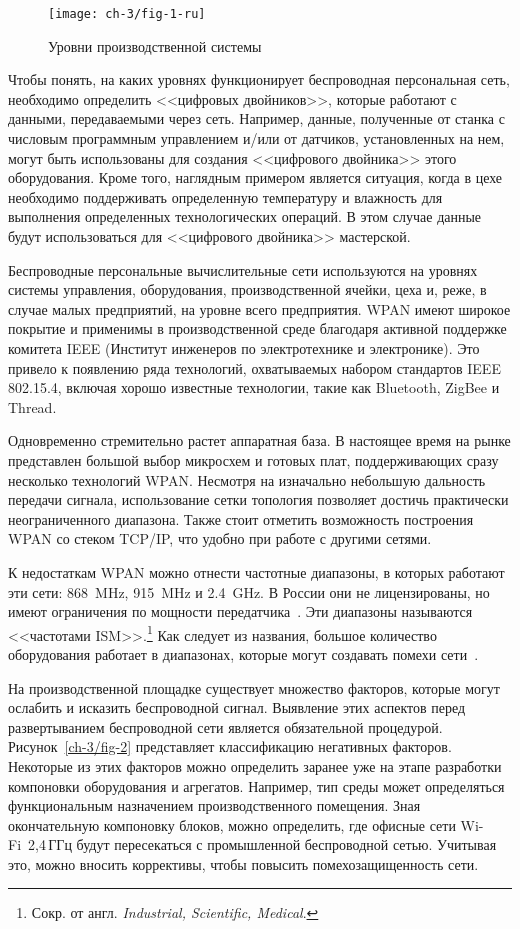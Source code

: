 \begin{figure*} [tb]
	\centering
	\texttt{[image: ch-3/fig-1-ru]}
	\caption{Уровни производственной системы}
	\label{ch-3/fig-1}
\end{figure*}

Чтобы понять, на каких уровнях функционирует беспроводная персональная сеть, необходимо определить <<цифровых двойников>>, которые работают с данными, передаваемыми через сеть. Например, данные, полученные от станка с числовым программным управлением и/или от датчиков, установленных на нем, могут быть использованы для создания <<цифрового двойника>> этого оборудования. Кроме того, наглядным примером является ситуация, когда в цехе необходимо поддерживать определенную температуру и влажность для выполнения определенных технологических операций. В этом случае данные будут использоваться для <<цифрового двойника>> мастерской.

Беспроводные персональные вычислительные сети используются на уровнях системы управления, оборудования, производственной ячейки, цеха и, реже, в случае малых предприятий, на уровне всего предприятия. WPAN имеют широкое покрытие и применимы в производственной среде благодаря активной поддержке комитета IEEE (Институт инженеров по электротехнике и электронике). Это привело к появлению ряда технологий, охватываемых набором стандартов IEEE 802.15.4, включая хорошо известные технологии, такие как Bluetooth, ZigBee и Thread.

Одновременно стремительно растет аппаратная база. В настоящее время на рынке представлен большой выбор микросхем и готовых плат, поддерживающих сразу несколько технологий WPAN. Несмотря на изначально небольшую дальность передачи сигнала, использование сетки топология позволяет достичь практически неограниченного диапазона. Также стоит отметить возможность построения WPAN со стеком TCP/IP, что удобно при работе с другими сетями.

К недостаткам WPAN можно отнести частотные диапазоны, в которых работают эти сети: \SI{868}{\mega\hertz}, \SI{915}{\mega\hertz} и \SI{2,4}{\giga\hertz}. В России они не лицензированы, но имеют ограничения по мощности передатчика~\cite{freq}. Эти диапазоны называются <<частотами ISM>>.\footnote{Сокр. от англ. \textit{Industrial, Scientific, Medical}.} Как следует из названия, большое количество оборудования работает в диапазонах, которые могут создавать помехи сети~\cite{750064, 6209430}.

На производственной площадке существует множество факторов, которые могут ослабить и исказить беспроводной сигнал. Выявление этих аспектов перед развертыванием беспроводной сети является обязательной процедурой. Рисунок~\cref{ch-3/fig-2} представляет классификацию негативных факторов. Некоторые из этих факторов можно определить заранее уже на этапе разработки компоновки оборудования и агрегатов. Например, тип среды может определяться функциональным назначением производственного помещения. Зная окончательную компоновку блоков, можно определить, где офисные сети Wi-Fi~2,4\,ГГц будут пересекаться с промышленной беспроводной сетью. Учитывая это, можно вносить коррективы, чтобы повысить помехозащищенность сети.

